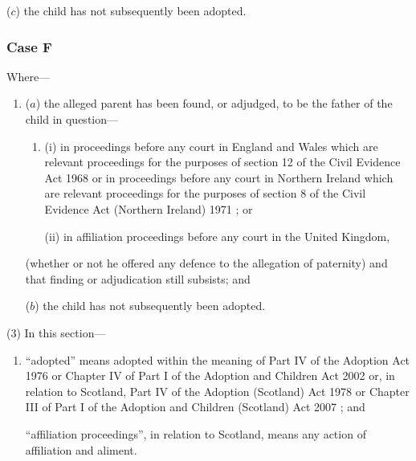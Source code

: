 \documentclass[12pt,a4paper]{article}
\begin{document}
\begin{enumerate}
\begin{enumerate}
    ($c$) 
    the child has not subsequently been adopted.
\end{enumerate}

    \subsubsection*{Case F}

    Where—
\begin{enumerate}\item[]
    ($a$) 
    the alleged parent has been found, or adjudged, to be the father of the child in question—
\begin{enumerate}\item[]
    (i) 
    in proceedings before any court in England and Wales which are relevant proceedings for the purposes of section 12 of the Civil Evidence Act 1968
or in proceedings before any court in Northern Ireland which are relevant proceedings for the purposes of section 8 of the Civil Evidence Act (Northern Ireland) 1971%
; or

    (ii) 
    in affiliation proceedings before any court in the United Kingdom,
\end{enumerate}

    (whether or not he offered any defence to the allegation of paternity) and that finding or adjudication still subsists; and

    ($b$) 
    the child has not subsequently been adopted. 
\end{enumerate}
\end{enumerate}

(3) In this section—
\begin{enumerate}\item[]
    “adopted” means adopted within the meaning of Part IV of the Adoption Act 1976 
or Chapter IV of Part I of the Adoption and Children Act 2002  %
or, in relation to Scotland, Part IV of the Adoption (Scotland) Act 1978
or Chapter III of Part I of the Adoption and Children (Scotland) Act 2007%
; and

    “affiliation proceedings”, in relation to Scotland, means any action of affiliation and aliment. 
\end{enumerate}
\end{document}
